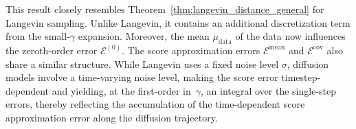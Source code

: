 \documentclass[11pt]{article}
\begin{document}
This result closely resembles Theorem~\ref{thm:langevin_distance_general} for Langevin sampling. Unlike Langevin, it contains an additional discretization term from the small-$\gamma$ expansion. Moreover, the mean $\mu_{\mathrm{data}}$ of the data now influences the zeroth-order error $\mathcal{E}^{(0)}$. The score approximation errors $\mathcal{E}^{\text{mean}}$ and $\mathcal{E}^{\text{cov}}$ also share a similar structure. While Langevin uses a fixed noise level $\sigma$, diffusion models involve a time-varying noise level, making the score error timestep-dependent and yielding, at the first-order in~$\gamma$, an integral over the single-step errors, thereby reflecting the accumulation of the time-dependent score approximation error along the diffusion trajectory. 

\vspace{-0.2cm}
\end{document}

